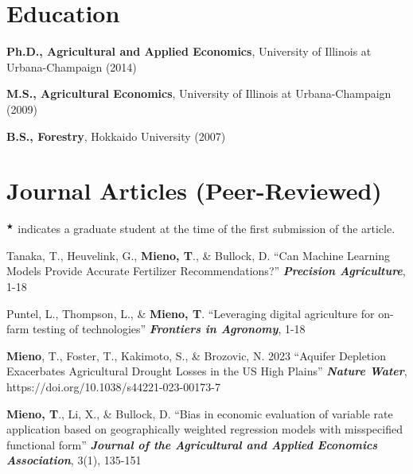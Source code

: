 \documentclass[10pt,margin,line]{res}
\newenvironment{list1}{
  \begin{list}{\ding{113}}{%
      \setlength{\itemsep}{0in}
      \setlength{\parsep}{0in} \setlength{\parskip}{0in}
      \setlength{\topsep}{0in} \setlength{\partopsep}{0in}
      \setlength{\leftmargin}{0.17in}}}{\end{list}}
\begin{document}
\begin{resume}
\section{\sc Education}
\begin{list1}
\item[] \textbf{Ph.D., Agricultural and Applied Economics}, University of Illinois at Urbana-Champaign (2014)
\item[] \textbf{M.S., Agricultural Economics}, University of Illinois at Urbana-Champaign (2009)
\item[] \textbf{B.S., Forestry}, Hokkaido University (2007)
\end{list1}


\section{\sc Journal Articles (Peer-Reviewed)}

$^\bigstar$ indicates a graduate student at the time of the first submission of the article.
\vspace*{0.3cm}

\begin{list1}

\item[] Tanaka, T., Heuvelink, G., \textbf{Mieno, T}., \& Bullock, D. ``Can Machine Learning Models Provide Accurate Fertilizer Recommendations?'' \textit{\textbf{Precision Agriculture}}, 1-18
\vspace*{0.3cm}

\item[] Puntel, L., Thompson, L., \& \textbf{Mieno, T}. ``Leveraging digital agriculture for on-farm testing of technologies'' \textit{\textbf{Frontiers in Agronomy}}, 1-18
\vspace*{0.3cm}

\item[] \textbf{Mieno}, T., Foster, T., Kakimoto, S., \& Brozovic, N. 2023 ``Aquifer Depletion Exacerbates Agricultural Drought Losses in the US High Plains'' \textit{\textbf{Nature Water}}, https://doi.org/10.1038/s44221-023-00173-7
\vspace*{0.3cm}

\item[] \textbf{Mieno, T}.,  Li, X., \& Bullock, D. ``Bias in economic evaluation of variable rate application based on geographically weighted regression models with misspecified functional form'' \textit{\textbf{Journal of the Agricultural and Applied Economics Association}}, 3(1), 135-151
\vspace*{0.3cm}


\end{list1}
\end{resume}
\end{document}
